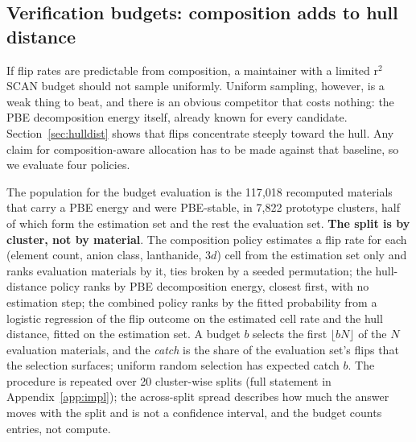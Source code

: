 \documentclass[11pt]{article}
\begin{document}
\subsection{Verification budgets: composition adds to hull distance}\label{sec:budget}

If flip rates are predictable from composition, a maintainer with a limited r$^2$SCAN
budget should not sample uniformly. Uniform sampling, however, is a weak thing to beat,
and there is an obvious competitor that costs nothing: the PBE decomposition energy
itself, already known for every candidate. Section~\ref{sec:hulldist} shows that flips
concentrate steeply toward the hull. Any claim for composition-aware allocation has to be
made against that baseline, so we evaluate four policies.

The population for the budget evaluation is the 117{,}018 recomputed materials that
carry a PBE energy and were PBE-stable, in 7{,}822 prototype clusters, half of which form the estimation
set and the rest the evaluation set. \textbf{The split is by cluster, not by
material}. The composition policy estimates a flip rate for each (element
count, anion class, lanthanide, 3$d$) cell from the estimation set only and ranks
evaluation materials by it, ties broken by a seeded permutation; the hull-distance
policy ranks by PBE decomposition energy, closest first, with no estimation step; the
combined policy ranks by the fitted probability from a logistic regression of the flip
outcome on the estimated cell rate and the hull distance, fitted on the estimation set.
A budget $b$ selects the first $\lfloor bN \rfloor$ of the $N$ evaluation materials,
and the \emph{catch} is the share of the evaluation set's flips that the selection
surfaces; uniform random selection has expected catch $b$. The procedure is repeated over
20 cluster-wise splits (full statement in Appendix~\ref{app:impl}); the across-split
spread describes how much the answer moves with the split and is not a confidence
interval, and the budget counts entries, not compute.
\end{document}
